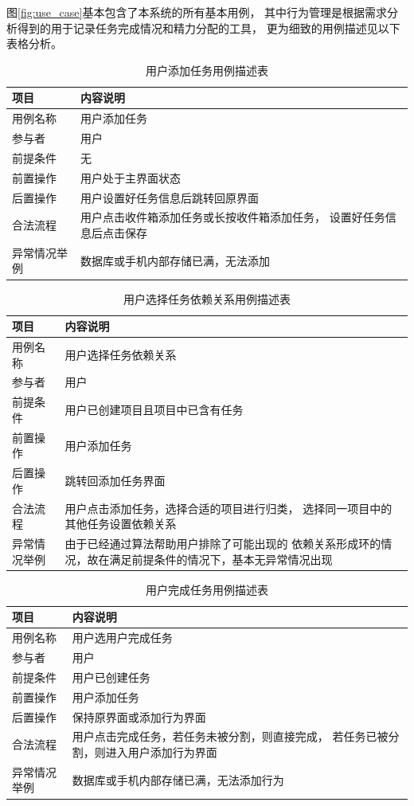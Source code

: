 图\ref{fig:use_case}基本包含了本系统的所有基本用例，
其中行为管理是根据需求分析得到的用于记录任务完成情况和精力分配的工具，
更为细致的用例描述见以下表格分析。

\begin{table}
	\centering
	\caption{用户添加任务用例描述表}
	\begin{tabular}{l|p{8cm}} \toprule
	  项目 & 内容说明 \\
	  \midrule
	  用例名称 & 用户添加任务 \\
	  参与者 & 用户 \\
	  前提条件 & 无 \\
	  前置操作 & 用户处于主界面状态 \\
	  后置操作 & 用户设置好任务信息后跳转回原界面 \\
	  合法流程 & 用户点击收件箱添加任务或长按收件箱添加任务，
	  设置好任务信息后点击保存 \\
	  异常情况举例 & 数据库或手机内部存储已满，无法添加 \\
	  \bottomrule
	\end{tabular}
\end{table}

\begin{table}
	\centering
	\caption{用户选择任务依赖关系用例描述表}
	\begin{tabular}{l|p{8cm}} \toprule
	  项目 & 内容说明 \\
	  \midrule
	  用例名称 & 用户选择任务依赖关系 \\
	  参与者 & 用户 \\
	  前提条件 & 用户已创建项目且项目中已含有任务 \\
	  前置操作 & 用户添加任务 \\
	  后置操作 & 跳转回添加任务界面 \\
	  合法流程 & 用户点击添加任务，选择合适的项目进行归类，
	  选择同一项目中的其他任务设置依赖关系 \\
	  异常情况举例 & 由于已经通过算法帮助用户排除了可能出现的
	  依赖关系形成环的情况，故在满足前提条件的情况下，基本无异常情况出现 \\
	  \bottomrule
	\end{tabular}
\end{table}

\begin{table}
	\centering
	\caption{用户完成任务用例描述表}
	\begin{tabular}{l|p{8cm}} \toprule
	  项目 & 内容说明 \\
	  \midrule
	  用例名称 & 用户选用户完成任务 \\
	  参与者 & 用户 \\
	  前提条件 & 用户已创建任务 \\
	  前置操作 & 用户添加任务 \\
	  后置操作 & 保持原界面或添加行为界面 \\
	  合法流程 & 用户点击完成任务，若任务未被分割，则直接完成，
	  若任务已被分割，则进入用户添加行为界面 \\
	  异常情况举例 & 数据库或手机内部存储已满，无法添加行为 \\
	  \bottomrule
	\end{tabular}
\end{table}

